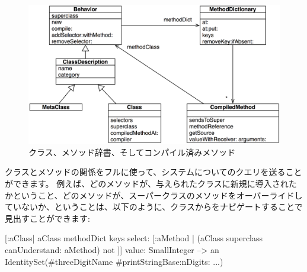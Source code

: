 \documentclass[a4paper,10pt,twoside]{book}
\begin{document}
\begin{figure}[ht]\centering
	\includegraphics[width=\linewidth]{MethodsAsObjects}
	\caption{クラス、メソッド辞書、そしてコンパイル済みメソッド\figlabel{MethodsAsObjects}}
\end{figure}

クラスとメソッドの関係をフルに使って、システムについてのクエリを送ることができます。
例えば、どのメソッドが、与えられたクラスに新規に導入されたかということ、\ie{}どのメソッドが、スーパークラスのメソッドをオーバーライドしていないか、ということは、以下のように、クラスからをナビゲートすることで見出すことができます:
\begin{code}{}
[:aClass| aClass methodDict keys select: [:aMethod |
  (aClass superclass canUnderstand: aMethod) not ]] value: SmallInteger
  --> an IdentitySet(#threeDigitName #printStringBase:nDigits: ...)
\end{code}
\end{document}
